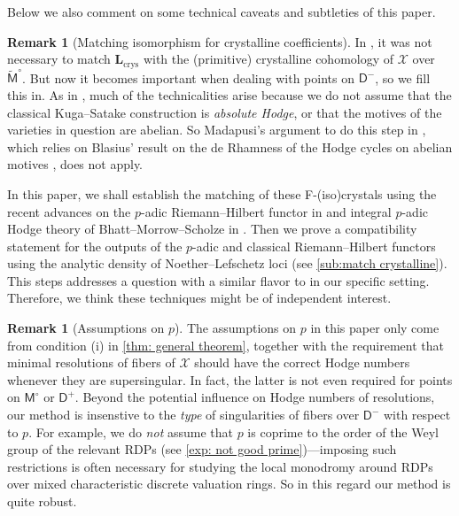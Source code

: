 \documentclass[11pt, letterpaper]{amsart}
\theoremstyle{plain}
\theoremstyle{definition}
\newtheorem{remark}[theorem]{Remark}
\newcommand{\<}{\langle}
\renewcommand{\>}{\rangle}
\def\wt{\widetilde}
\newcommand{\sfD}{\mathsf{D}}
\newcommand{\sfM}{\mathsf{M}}
\newcommand{\sX}{\mathcal{X}}
\newcommand{\bL}{\mathbf{L}}
\newcommand{\crys}{\mathrm{crys}}
\begin{document}
Below we also comment on some technical caveats and subtleties of this paper. 
\begin{remark}[Matching isomorphism for crystalline coefficients]
    \label{rmk: matching crystalline} In \cite{HYZ}, it was not necessary to match $\bL_\crys$ with the (primitive) crystalline cohomology of $\sX$ over $\wt{\sfM}^\circ$. But now it becomes important when dealing with points on $\sfD^-$, so we fill this in. As in \cite{HYZ}, much of the technicalities arise because we do not assume that the classical Kuga--Satake construction is \textit{absolute Hodge}, or that the motives of the varieties in question are abelian.
    So Madapusi's argument to do this step in \cite{MPTate}, which relies on Blasius' result on the de Rhamness of the Hodge cycles on abelian motives \cite{Blasius}, does not apply. 
    
    In this paper, we shall establish the matching of these F-(iso)crystals using the recent advances on the $p$-adic Riemann--Hilbert functor in \cite{DLLZ} and integral $p$-adic Hodge theory of Bhatt--Morrow--Scholze in \cite{BMS}. 
    Then we prove a compatibility statement for the outputs of the $p$-adic and classical Riemann--Hilbert functors using the analytic density of Noether--Lefschetz loci (see \cref{sub:match crystalline}). 
    This steps addresses a question with a similar flavor to \cite[Conjecture~1.4]{DLLZ} in our specific setting.
    Therefore, we think these techniques might be of independent interest. 
\end{remark}
\begin{remark}[Assumptions on $p$]
    The assumptions on $p$ in this paper only come from condition (i) in \cref{thm: general theorem}, together with the requirement that minimal resolutions of fibers of $\sX$ should have the correct Hodge numbers whenever they are supersingular. 
    In fact, the latter is not even required for points on $\sfM^\circ$ or $\sfD^+$. 
    Beyond the potential influence on Hodge numbers of resolutions, our method is insenstive to the \textit{type} of singularities of fibers over $\sfD^-$ with respect to $p$. 
    For example, we do \emph{not} assume that $p$ is coprime to the order of the Weyl group of the relevant RDPs (see \cref{exp: not good prime})---imposing such restrictions is often necessary for studying the local monodromy around RDPs over mixed characteristic discrete valuation rings. 
    So in this regard our method is quite robust. 
\end{remark}
\end{document}
